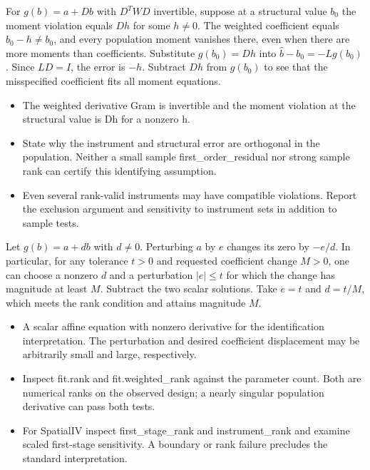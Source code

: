 \expandafter\def\csname statadic@statement@STATADIC-IV-002\endcsname{For $g(b)=a+Db$ with $D^TWD$ invertible, suppose at a
  structural value $b_0$ the moment violation equals $D h$ for some $h\ne0$.
  The weighted coefficient equals $b_0-h\ne b_0$, and every population
  moment vanishes there, even when there are more moments than coefficients.}
\expandafter\def\csname statadic@proof@STATADIC-IV-002\endcsname{Substitute $g(b_0)=Dh$ into $\hat b-b_0=-Lg(b_0)$.
  Since $LD=I$, the error is $-h$. Subtract $Dh$ from $g(b_0)$ to see
  that the misspecified coefficient fits all moment equations.}
\expandafter\def\csname statadic@assumptions@STATADIC-IV-002\endcsname{\begin{itemize}
\item The weighted derivative Gram is invertible and the moment violation at the structural value is Dh for a nonzero h.
\end{itemize}}
\expandafter\def\csname statadic@diagnostics@STATADIC-IV-002\endcsname{\begin{itemize}
\item State why the instrument and structural error are orthogonal in the population. Neither a small sample first\_order\_residual nor strong sample rank can certify this identifying assumption.
\item Even several rank-valid instruments may have compatible violations. Report the exclusion argument and sensitivity to instrument sets in addition to sample tests.
\end{itemize}}
\expandafter\def\csname statadic@statement@STATADIC-IV-003\endcsname{Let $g(b)=a+db$ with $d\ne0$. Perturbing $a$ by $e$
  changes its zero by $-e/d$. In particular, for any tolerance $t>0$ and
  requested coefficient change $M>0$, one can choose a nonzero $d$ and a
  perturbation $|e|\le t$ for which the change has magnitude at least $M$.}
\expandafter\def\csname statadic@proof@STATADIC-IV-003\endcsname{Subtract the two scalar solutions. Take $e=t$ and $d=t/M$,
  which meets the rank condition and attains magnitude $M$.}
\expandafter\def\csname statadic@assumptions@STATADIC-IV-003\endcsname{\begin{itemize}
\item A scalar affine equation with nonzero derivative for the identification interpretation. The perturbation and desired coefficient displacement may be arbitrarily small and large, respectively.
\end{itemize}}
\expandafter\def\csname statadic@diagnostics@STATADIC-IV-003\endcsname{\begin{itemize}
\item Inspect fit.rank and fit.weighted\_rank against the parameter count. Both are numerical ranks on the observed design; a nearly singular population derivative can pass both tests.
\item For SpatialIV inspect first\_stage\_rank and instrument\_rank and examine scaled first-stage sensitivity. A boundary or rank failure precludes the standard interpretation.
\end{itemize}}
